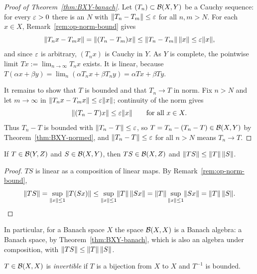 \begin{proof}[Proof of Theorem~\ref{thm:BXY-banach}]
Let $(T_n) \subset \mathcal{B}(X, Y)$ be a Cauchy sequence: for every $\varepsilon > 0$
there is an $N$ with $\lVert T_n - T_m\rVert \le \varepsilon$ for all $n, m > N$. For
each $x \in X$, Remark~\ref{rem:op-norm-bound} gives
\[
  \lVert T_n x - T_m x\rVert = \lVert(T_n - T_m)x\rVert
  \le \lVert T_n - T_m\rVert\,\lVert x\rVert \le \varepsilon \lVert x\rVert,
\]
and since $\varepsilon$ is arbitrary, $(T_n x)$ is Cauchy in $Y$. As $Y$ is
complete, the pointwise limit $Tx := \lim_{n \to \infty} T_n x$ exists. It
is linear, because
$T(\alpha x + \beta y) = \lim_n (\alpha T_n x + \beta T_n y)
= \alpha Tx + \beta Ty$.

It remains to show that $T$ is bounded and that $T_n \to T$ in norm. Fix
$n > N$ and let $m \to \infty$ in $\lVert T_n x - T_m x\rVert \le \varepsilon\lVert x\rVert$;
continuity of the norm gives
\[
  \lVert(T_n - T)x\rVert \le \varepsilon \lVert x\rVert \qquad \text{for all } x \in X .
\]
Thus $T_n - T$ is bounded with $\lVert T_n - T\rVert \le \varepsilon$, so
$T = T_n - (T_n - T) \in \mathcal{B}(X, Y)$ by Theorem~\ref{thm:BXY-normed}, and
$\lVert T_n - T\rVert \le \varepsilon$ for all $n > N$ means $T_n \to T$.
\end{proof}

\begin{proposition}[Composition]\label{prop:composition}
If $T \in \mathcal{B}(Y, Z)$ and $S \in \mathcal{B}(X, Y)$, then $TS \in \mathcal{B}(X, Z)$ and
$\lVert TS\rVert \le \lVert T\rVert\,\lVert S\rVert$.
\end{proposition}

\begin{proof}
$TS$ is linear as a composition of linear maps. By
Remark~\ref{rem:op-norm-bound},
\[
  \lVert TS\rVert = \sup_{\lVert x\rVert \le 1} \lVert T(Sx)\rVert
  \le \sup_{\lVert x\rVert \le 1} \lVert T\rVert\,\lVert Sx\rVert
  = \lVert T\rVert \sup_{\lVert x\rVert \le 1} \lVert Sx\rVert = \lVert T\rVert\,\lVert S\rVert .
  \qedhere
\]
\end{proof}

\begin{remark}
In particular, for a Banach space $X$ the space $\mathcal{B}(X, X)$ is a Banach
algebra: a Banach space, by Theorem~\ref{thm:BXY-banach}, which is also an
algebra under composition, with $\lVert TS\rVert \le \lVert T\rVert\,\lVert S\rVert$.
\end{remark}

\begin{definition}\label{def:invertible}
$T \in \mathcal{B}(X, X)$ is \emph{invertible} if $T$ is a bijection from $X$ to
$X$ and $T^{-1}$ is bounded.
\end{definition}
